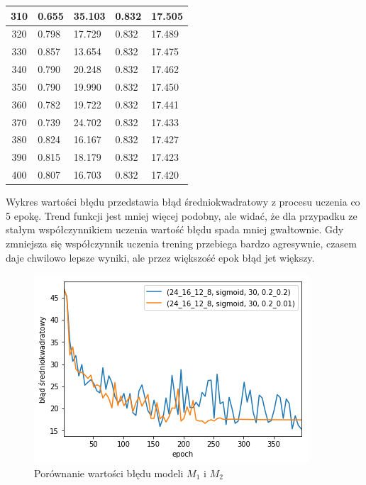 \documentclass{report}
\begin{document}
\begin{minipage}{\textwidth}
\begin{longtable}{|c|l|l|l|l|}
                     310 & 0.655 & 35.103 & 0.832 & 17.505 \\ \hline
                     320 & 0.798 & 17.729 & 0.832 & 17.489 \\ \hline
                     330 & 0.857 & 13.654 & 0.832 & 17.475 \\ \hline
                     340 & 0.790 & 20.248 & 0.832 & 17.462 \\ \hline
                     350 & 0.790 & 19.990 & 0.832 & 17.450 \\ \hline
                     360 & 0.782 & 19.722 & 0.832 & 17.441 \\ \hline
                     370 & 0.739 & 24.702 & 0.832 & 17.433 \\ \hline
                     380 & 0.824 & 16.167 & 0.832 & 17.427 \\ \hline
                     390 & 0.815 & 18.179 & 0.832 & 17.423 \\ \hline
                     400 & 0.807 & 16.703 & 0.832 & 17.420 \\ \hline
                 \end{longtable}
    \end{minipage}


    Wykres wartości błędu przedstawia błąd średniokwadratowy z procesu uczenia co 5 epokę.
    Trend funkcji jest mniej więcej podobny, ale widać, że dla przypadku ze stałym współczynnikiem uczenia wartość błędu spada mniej gwałtownie.
    Gdy zmniejsza się współczynnik uczenia trening przebiega bardzo agresywnie, czasem daje chwilowo lepsze wyniki, ale przez większość epok błąd jet większy.

    \begin{figure}[htp]
        \centering
        \includegraphics[scale=0.8]{./img/lr-error.png}
        \caption{Porównanie wartości błędu modeli $M_1$ i $M_2$}
    \end{figure}
\end{document}
